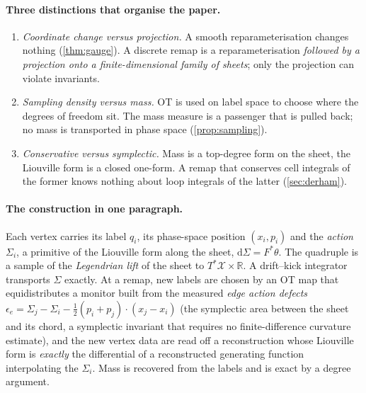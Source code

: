 \documentclass[11pt,a4paper]{article}
\numberwithin{equation}{section}
\theoremstyle{definition}
\theoremstyle{remark}
\newcommand{\R}{\mathbb{R}}
\newcommand{\X}{\mathcal{X}}
\newcommand{\dd}{\mathrm{d}}
\newcommand{\eps}{\epsilon}
\begin{document}
\paragraph{Three distinctions that organise the paper.}
\begin{enumerate}[leftmargin=2em,itemsep=2pt]
\item \emph{Coordinate change versus projection.} A smooth reparameterisation changes nothing
(\cref{thm:gauge}). A discrete remap is a reparameterisation \emph{followed by a projection onto a
finite-dimensional family of sheets}; only the projection can violate invariants.
\item \emph{Sampling density versus mass.} OT is used on label space to choose where the degrees of freedom sit.
The mass measure is a passenger that is pulled back; no mass is transported in phase space
(\cref{prop:sampling}).
\item \emph{Conservative versus symplectic.} Mass is a top-degree form on the sheet, the Liouville form is a
closed one-form. A remap that conserves cell integrals of the former knows nothing about loop integrals of the
latter (\cref{sec:derham}).
\end{enumerate}

\paragraph{The construction in one paragraph.} Each vertex carries its label $q_i$, its phase-space position
$(x_i,p_i)$ and the \emph{action} $\Sigma_i$, a primitive of the Liouville form along the sheet,
$\dd\Sigma=F^*\theta$. The quadruple is a sample of the \emph{Legendrian lift} of the sheet to
$T^*\X\times\R$. A drift--kick integrator transports $\Sigma$ exactly. At a remap, new labels are chosen by an
OT map that equidistributes a monitor built from the measured \emph{edge action defects}
$\eps_e=\Sigma_j-\Sigma_i-\tfrac12(p_i+p_j)\cdot(x_j-x_i)$ (the symplectic area between the sheet and its chord,
a symplectic invariant that requires no finite-difference curvature estimate), and the new vertex data are read
off a reconstruction whose Liouville form is \emph{exactly} the differential of a reconstructed generating
function interpolating the $\Sigma_i$. Mass is recovered from the labels and is exact by a degree argument.
\end{document}
